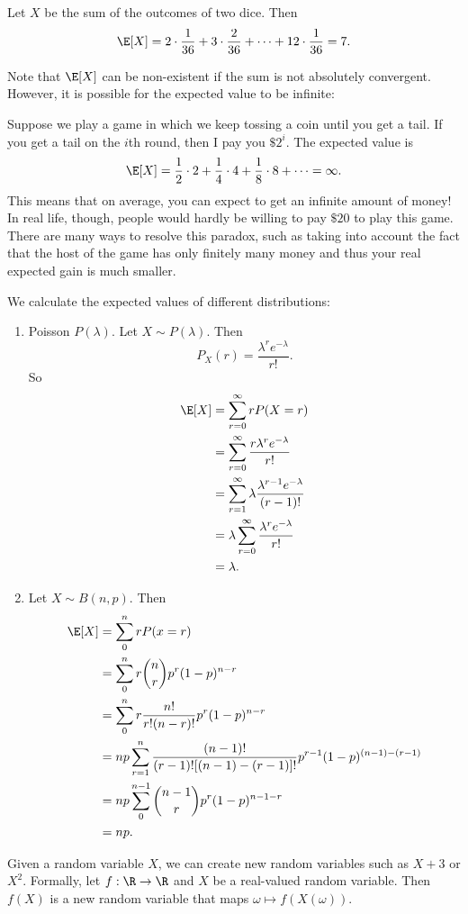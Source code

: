 \documentclass[a4paper]{article}
\begin{document}
\begin{eg}
  Let $X$ be the sum of the outcomes of two dice. Then
  \[
    \E[X] = 2\cdot \frac{1}{36} + 3\cdot \frac{2}{36} + \cdots + 12\cdot \frac{1}{36} = 7.
  \]
\end{eg}
Note that $\E[X]$ can be non-existent if the sum is not absolutely convergent. However, it is possible for the expected value to be infinite:

\begin{eg}
  Suppose we play a game in which we keep tossing a coin until you get a tail. If you get a tail on the $i$th round, then I pay you $\$2^i$. The expected value is
  \[
    \E[X] = \frac{1}{2}\cdot 2 + \frac{1}{4}\cdot 4 + \frac{1}{8}\cdot 8 + \cdots = \infty.
  \]
  This means that on average, you can expect to get an infinite amount of money! In real life, though, people would hardly be willing to pay $\$20$ to play this game. There are many ways to resolve this paradox, such as taking into account the fact that the host of the game has only finitely many money and thus your real expected gain is much smaller.
\end{eg}

\begin{eg}
  We calculate the expected values of different distributions:
  \begin{enumerate}
    \item Poisson $P(\lambda)$. Let $X\sim P(\lambda)$. Then
      \[
        P_X(r) = \frac{\lambda^r e^{-\lambda}}{r!}.
      \]
      So
      \begin{align*}
        \E[X] &= \sum_{r = 0}^\infty rP(X = r)\\
        &= \sum_{r = 0}^\infty \frac{r \lambda^r e^{-\lambda}}{r!}\\
        &= \sum_{r = 1}^\infty \lambda \frac{\lambda^{r - 1}e^{-\lambda}}{(r - 1)!}\\
        &= \lambda\sum_{r = 0}^\infty\frac{\lambda^r e^{-\lambda}}{r!}\\
        &= \lambda.
      \end{align*}
    \item Let $X\sim B(n, p)$. Then
      \begin{align*}
        \E[X] &= \sum_0^n rP(x = r)\\
        &= \sum_0^n r\binom{n}{r} p^r(1 - p)^{n - r}\\
        &= \sum_0^n r\frac{n!}{r!(n - r)!}p^r (1 - p)^{n - r}\\
        &= np\sum_{r = 1}^n \frac{(n - 1)!}{(r - 1)![(n - 1) - (r - 1)]!}p^{r - 1}(1 - p)^{(n - 1) - (r - 1)}\\
        &= np\sum_{0}^{n - 1}\binom{n - 1}{r}p^r(1 - p)^{n - 1 - r}\\
        &= np.
      \end{align*}
  \end{enumerate}
\end{eg}
Given a random variable $X$, we can create new random variables such as $X + 3$ or $X^2$. Formally, let $f: \R \to \R$ and $X$ be a real-valued random variable. Then $f(X)$ is a new random variable that maps $\omega \mapsto f(X(\omega))$.
\end{document}
